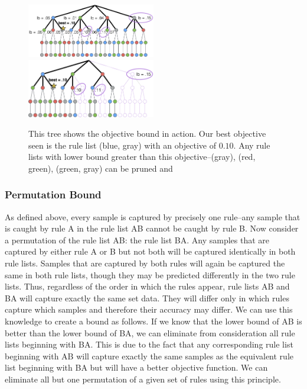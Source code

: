 \documentclass[]{article}
\theoremstyle{definition}
\begin{document}
\begin{figure}
\includegraphics[width=0.5\textwidth]{figs/ela_branch-and-bound-tree.png}
\includegraphics[width=0.5\textwidth]{figs/ela_branch-and-bound-tree-pruned.png}
\caption[Objective bound]{This tree shows the objective bound in action. Our best objective seen is the rule list (blue, gray) with an objective of $0.10$. Any rule lists with lower bound greater than this objective--(gray), (red, green), (green, gray) can be pruned and
\label{fig:objective-bound}}
\end{figure}

\subsubsection{Permutation Bound}

As defined above, every sample is captured by precisely one rule--any sample that is caught by rule A in the rule list AB cannot be caught by rule B. 
Now consider a permutation of the rule list AB: the rule list BA.
Any samples that are captured by either rule A or B but not both will be captured identically in both rule lists.
Samples that are captured by both rules will again be captured the same in both rule lists, though they may be predicted differently in the two rule lists.
Thus, regardless of the order in which the rules appear, rule lists AB and BA will capture exactly the same set data.
They will differ only in which rules capture which samples and therefore their accuracy may differ. 
We can use this knowledge to create a bound as follows.
If we know that the lower bound of AB is better than the lower bound of BA, we can eliminate from consideration all rule lists beginning with BA.
This is due to the fact that any corresponding rule list beginning with AB will capture exactly the same samples as the equivalent rule list beginning with BA but will have a better objective function.
We can eliminate all but one permutation of a given set of rules using this principle.
\end{document}
